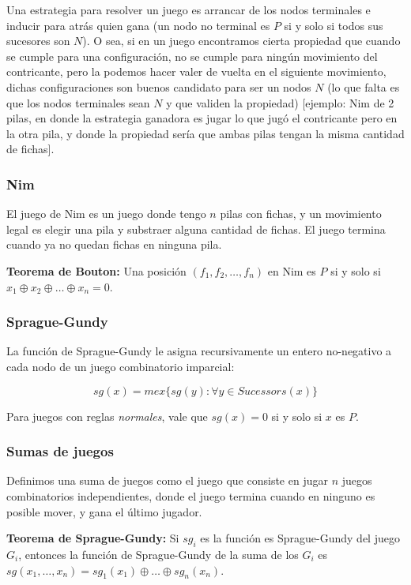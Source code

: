 Una estrategia para resolver un juego es arrancar de los nodos
terminales e inducir para atrás quien gana (un nodo no terminal es $P$ si y solo
si todos sus sucesores son $N$). O sea, si en un juego encontramos cierta
propiedad que cuando se cumple para una configuración, no se cumple para ningún
movimiento del contricante, pero la podemos hacer valer de vuelta en el
siguiente movimiento, dichas configuraciones son buenos candidato para ser un
nodos $N$ (lo que falta es que los nodos terminales sean $N$ y que validen la
propiedad) [ejemplo: Nim de 2 pilas, en donde la estrategia ganadora es jugar lo
que jugó el contricante pero en la otra pila, y donde la propiedad sería que
ambas pilas tengan la misma cantidad de fichas].

\subsubsection*{Nim}

El juego de Nim es un juego donde tengo $n$ pilas con fichas, y un movimiento
legal es elegir una pila y substraer alguna cantidad de fichas. El juego termina
cuando ya no quedan fichas en ninguna pila.

\textbf{Teorema de Bouton:} Una posición $(f_1, f_2, \dots, f_n)$ en Nim es $P$
si y solo si $x_1 \oplus x_2 \oplus \dots \oplus x_n = 0$. 

\subsubsection*{Sprague-Gundy}

La función de Sprague-Gundy le asigna recursivamente un entero no-negativo a
cada nodo de un juego combinatorio imparcial:

\begin{equation*}
    sg(x) = mex \{ sg(y) : \forall y \in Sucessors(x) \}
\end{equation*}

Para juegos con reglas \textit{normales}, vale que $sg(x) = 0$ si y solo si $x$
es $P$.

\subsubsection*{Sumas de juegos}

Definimos una suma de juegos como el juego que consiste en jugar $n$ juegos
combinatorios independientes, donde el juego termina cuando en ninguno es
posible mover, y gana el último jugador.

\textbf{Teorema de Sprague-Gundy:} Si $sg_i$ es la función es Sprague-Gundy del
juego $G_i$, entonces la función de Sprague-Gundy de la suma de los $G_i$ es
$sg(x_1, \dots, x_n) = sg_1(x_1) \oplus \dots \oplus sg_n(x_n)$.
